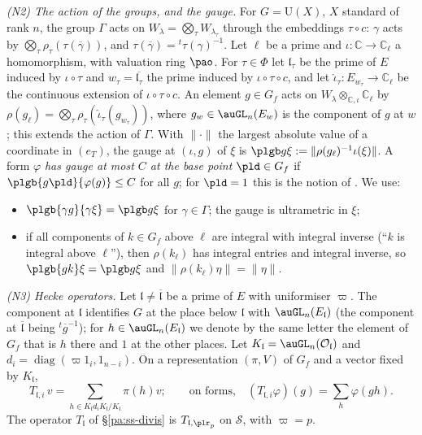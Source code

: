 \documentclass[10pt]{amsart}
\theoremstyle{definition}
\theoremstyle{remark}
\newcommand{\C}{\mathbb C}
\providecommand{\auO}{\mathcal O}
\providecommand{\auPl}{\Phi}
\providecommand{\auS}{\mathcal S}
\providecommand{\auU}{\mathrm U}
\providecommand{\aubar}[1]{\overline{#1}}
\begin{document}
\emph{{\rm(N2)} The action of the groups, and the gauge.} For $G=\auU(X)$, $X$ standard of rank
$n$, the group $\Gamma$ acts on $W_\lambda=\bigotimes_\tau W_{\lambda_\tau}$ through the embeddings
$\tau\circ c$: $\gamma$ acts by $\bigotimes_\tau\rho_\tau(\tau(\aubar\gamma))$, and
$\tau(\aubar\gamma)={}^t\tau(\gamma)^{-1}$. Let $\ell$ be a prime and $\iota\colon\C\to\C_\ell$ a
homomorphism, with valuation ring $\pao$. For $\tau\in\auPl$ let $\mathfrak l_\tau$ be the prime of
$E$ induced by $\iota\circ\tau$ and $w_\tau=\aubar{\mathfrak l_\tau}$ the prime induced by
$\iota\circ\tau\circ c$, and let $\hat\iota_\tau\colon E_{w_\tau}\to\C_\ell$ be the continuous
extension of $\iota\circ\tau\circ c$. An element $g\in G_f$ acts on $W_\lambda\otimes_{\C,\iota}
\C_\ell$ by $\rho(g_\ell)=\bigotimes_\tau\rho_\tau(\hat\iota_\tau(g_{w_\tau}))$, where $g_w\in\auGL_n
(E_w)$ is the component of $g$ at $w$; this extends the action of $\Gamma$. With $\|\cdot\|$ the
largest absolute value of a coordinate in $(e_T)$, the gauge at $(\iota,g)$ of $\xi$ is
$\plgb g\xi:=\|\rho(g_\ell)^{-1}\iota(\xi)\|$. A form $\varphi$ \emph{has gauge at most $C$ at
the base point $\pld\in G_f$} if $\plgb{g\pld}{\varphi(g)}\le C$ for all $g$; for $\pld=1$ this is
the notion of {\cite[\S14.3]{P46}}. We use:
\begin{itemize}
\item[(G1)] $\plgb{\gamma g}{\gamma\xi}=\plgb g\xi$ for $\gamma\in\Gamma$; the gauge is
ultrametric in $\xi$;
\item[(G2)] if all components of $k\in G_f$ above $\ell$ are integral with integral inverse
(``$k$ is integral above $\ell$''), then $\rho(k_\ell)$ has integral entries and integral inverse,
so $\plgb{gk}\xi=\plgb g\xi$ and $\|\rho(k_\ell)\eta\|=\|\eta\|$.
\end{itemize}

\emph{{\rm(N3)} Hecke operators.} Let $\mathfrak l\ne\aubar{\mathfrak l}$ be a prime of $E$ with
uniformiser $\varpi$. The component at $\mathfrak l$ identifies $G$ at the place below $\mathfrak
l$ with $\auGL_n(E_{\mathfrak l})$ (the component at $\aubar{\mathfrak l}$ being ${}^t\aubar
g^{-1}$); for $h\in\auGL_n(E_{\mathfrak l})$ we denote by the same letter the element of $G_f$ that
is $h$ there and $1$ at the other places. Let $K_{\mathfrak l}=\auGL_n(\auO_{\mathfrak l})$ and
$d_i=\operatorname{diag}(\varpi1_i,1_{n-i})$. On a representation $(\pi,V)$ of $G_f$ and a vector
fixed by $K_{\mathfrak l}$,
\[
T_{\mathfrak l,i}\,v=\sum_{h\in K_{\mathfrak l}d_iK_{\mathfrak l}/K_{\mathfrak l}}\pi(h)v ;\qquad
\text{on forms,}\quad(T_{\mathfrak l,i}\varphi)(g)=\sum_h\varphi(gh).
\]
The operator $T_{\mathfrak l}$ of \S\ref{pa:ss-divis} is $T_{\mathfrak l,\plr_p}$ on $\auS$, with
$\varpi=p$.
\end{document}
